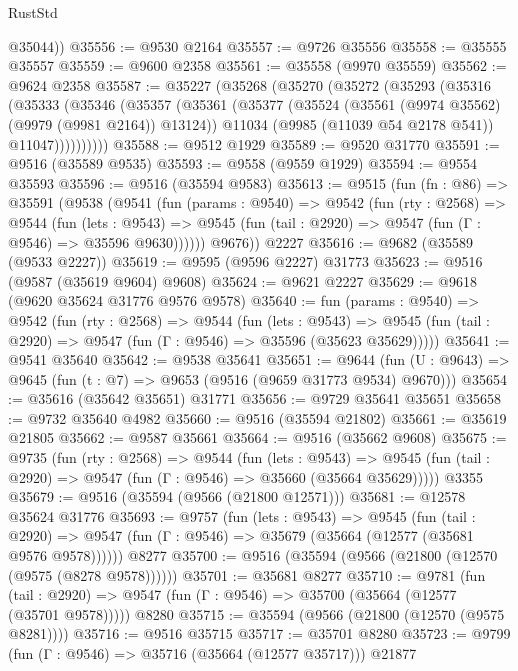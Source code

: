 \begin{lexlean}{RustStd}
\begin{coremodule}
        @35044))
@35556 := @9530 @2164
@35557 := @9726 @35556
@35558 := @35555 @35557
@35559 := @9600 @2358
@35561 := @35558 (@9970 @35559)
@35562 := @9624 @2358
@35587 := @35227
    (@35268
      (@35270
        (@35272
          (@35293
            (@35316
              (@35333
                (@35346
                  (@35357
                    (@35361
                      (@35377
                        (@35524 (@35561 (@9974 @35562) (@9979 (@9981 @2164)) @13124))
                        @11034
                        (@9985 (@11039 @54 @2178 @541))
                        @11047))))))))))
@35588 := @9512 @1929
@35589 := @9520 @31770
@35591 := @9516 (@35589 @9535)
@35593 := @9558 (@9559 @1929)
@35594 := @9554 @35593
@35596 := @9516 (@35594 @9583)
@35613 := @9515
    (fun (fn : @86) =>
    @35591
      (@9538
        (@9541
          (fun (params : @9540) =>
          @9542
            (fun (rty : @2568) =>
            @9544
              (fun (lets : @9543) =>
              @9545 (fun (tail : @2920) => @9547 (fun (Γ : @9546) => @35596 @9630))))))
        @9676))
    @2227
@35616 := @9682 (@35589 (@9533 @2227))
@35619 := @9595 (@9596 @2227) @31773
@35623 := @9516 (@9587 (@35619 @9604) @9608)
@35624 := @9621 @2227
@35629 := @9618 (@9620 @35624 @31776 @9576 @9578)
@35640 := fun (params : @9540) =>
  @9542
    (fun (rty : @2568) =>
    @9544
      (fun (lets : @9543) =>
      @9545 (fun (tail : @2920) => @9547 (fun (Γ : @9546) => @35596 (@35623 @35629)))))
@35641 := @9541 @35640
@35642 := @9538 @35641
@35651 := @9644
    (fun (U : @9643) => @9645 (fun (t : @7) => @9653 (@9516 (@9659 @31773 @9534) @9670)))
@35654 := @35616 (@35642 @35651) @31771
@35656 := @9729 @35641 @35651
@35658 := @9732 @35640 @4982
@35660 := @9516 (@35594 @21802)
@35661 := @35619 @21805
@35662 := @9587 @35661
@35664 := @9516 (@35662 @9608)
@35675 := @9735
    (fun (rty : @2568) =>
    @9544
      (fun (lets : @9543) =>
      @9545 (fun (tail : @2920) => @9547 (fun (Γ : @9546) => @35660 (@35664 @35629)))))
    @3355
@35679 := @9516 (@35594 (@9566 (@21800 @12571)))
@35681 := @12578 @35624 @31776
@35693 := @9757
    (fun (lets : @9543) =>
    @9545
      (fun (tail : @2920) =>
      @9547 (fun (Γ : @9546) => @35679 (@35664 (@12577 (@35681 @9576 @9578))))))
    @8277
@35700 := @9516 (@35594 (@9566 (@21800 (@12570 (@9575 (@8278 @9578))))))
@35701 := @35681 @8277
@35710 := @9781
    (fun (tail : @2920) => @9547 (fun (Γ : @9546) => @35700 (@35664 (@12577 (@35701 @9578)))))
    @8280
@35715 := @35594 (@9566 (@21800 (@12570 (@9575 @8281))))
@35716 := @9516 @35715
@35717 := @35701 @8280
@35723 := @9799 (fun (Γ : @9546) => @35716 (@35664 (@12577 @35717))) @21877

\end{coremodule}
\end{lexlean}
